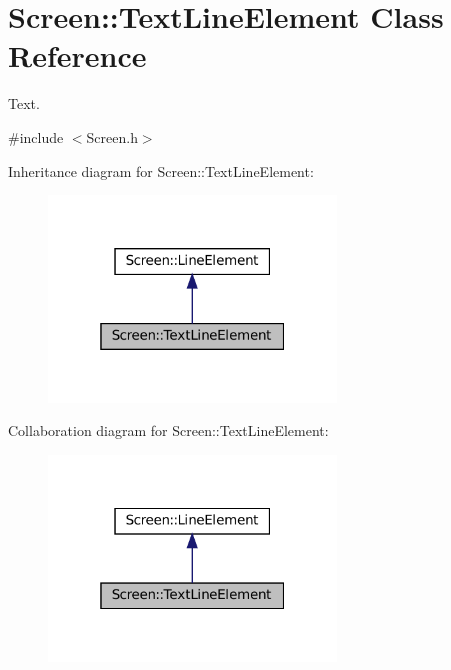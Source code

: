\hypertarget{classScreen_1_1TextLineElement}{}\section{Screen\+:\+:Text\+Line\+Element Class Reference}
\label{classScreen_1_1TextLineElement}


Text.  




{\ttfamily \#include $<$Screen.\+h$>$}



Inheritance diagram for Screen\+:\+:Text\+Line\+Element\+:
\nopagebreak
\begin{figure}[H]
\begin{center}
\leavevmode
\includegraphics[width=217pt]{classScreen_1_1TextLineElement__inherit__graph}
\end{center}
\end{figure}


Collaboration diagram for Screen\+:\+:Text\+Line\+Element\+:
\nopagebreak
\begin{figure}[H]
\begin{center}
\leavevmode
\includegraphics[width=217pt]{classScreen_1_1TextLineElement__coll__graph}
\end{center}
\end{figure}
